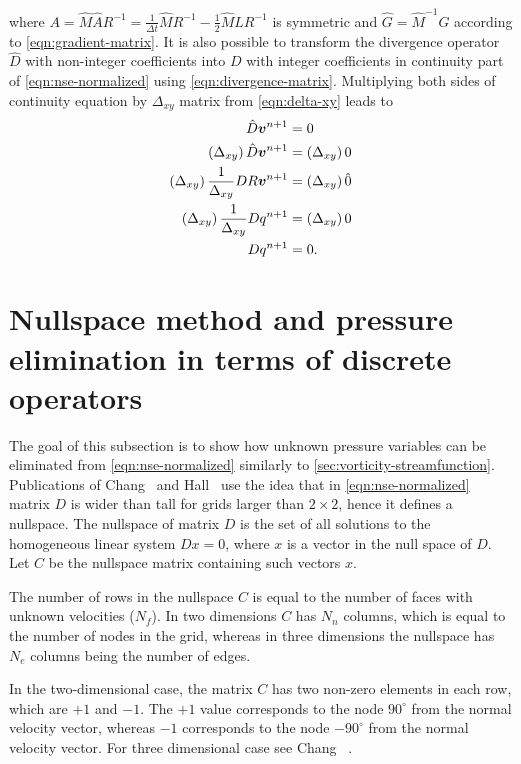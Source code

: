 \documentclass{article}
\numberwithin{equation}{section}
\begin{document}
where $A=\hat{M}\hat{A}R^{-1}=\frac{1}{\Delta t}\hat{M}R^{-1}-\frac{1}{2}\hat{M}\hat{L}R^{-1}$ is symmetric and $\hat{G}=\hat{M}^{-1}G$ according to \cref{eqn:gradient-matrix}. It is also possible to transform the divergence operator $\hat{D}$ with non-integer coefficients into $D$ with integer coefficients in continuity part of \cref{eqn:nse-normalized} using  \cref{eqn:divergence-matrix}. Multiplying both sides of continuity equation by $\Delta _{xy}$ matrix from \cref{eqn:delta-xy} leads to 
\begin{align*}
	\hat{D}\boldsymbol{v}^{n+1}&= 0\notag\\
	\left(\Delta_{xy} \right)\hat{D}\boldsymbol{v}^{n+1}&=\left ( \Delta_{xy}\right ) 0\notag\\
	\left(\Delta_{xy}\right)\frac{1}{\Delta _{xy}}{D}R\boldsymbol{v}^{n+1}&=\left ( \Delta_{xy}\right ) \hat0\notag\\
	\left(\Delta_{xy}\right)\frac{1}{\Delta_{xy}}{D}q^{n+1}&=\left ( \Delta_{xy}\right ) 0\notag\\
	D{q}^{n+1}&=0.
\end{align*}




\pagebreak
\section{Nullspace method and pressure elimination in terms of discrete operators}\label{sec:nullspace-method}

The goal of this subsection is to show how unknown pressure variables can be eliminated from \cref{eqn:nse-normalized} similarly to \cref{sec:vorticity-streamfunction}. Publications of Chang~\cite{Chang:2002} and Hall~\cite{Hall:1980} use the idea that in \cref{eqn:nse-normalized} matrix $D$ is wider than tall for grids larger than $2\times 2$, hence it defines a nullspace. The nullspace of matrix $D$ is the set of all solutions to the homogeneous linear system $Dx = 0$, where $x$ is a vector in the null space of $D$. Let $C$ be the nullspace matrix containing such vectors $x$. 

The number of rows in the nullspace $C$ is equal to the number of faces with unknown velocities ($N_f$). In two dimensions $C$ has $N_n$ columns, which is equal to the number of nodes in the grid, whereas in three dimensions the nullspace has $N_e$ columns being the number of edges. 

In the two-dimensional case, the matrix $C$ has two non-zero elements in each row, which are $+1$ and $-1$. The $+1$ value corresponds to the node $90^\circ$ from the normal velocity vector, whereas $-1$ corresponds to the node $-90^\circ$ from the normal velocity vector.  For three dimensional case see Chang ~\cite{Chang:2002}.
\end{document}
